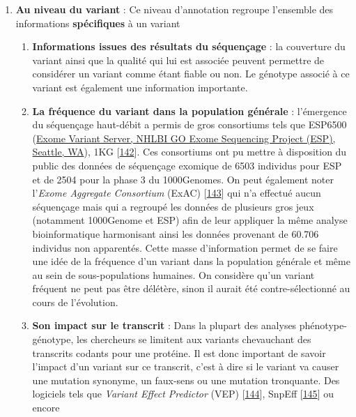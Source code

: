 \documentclass[12pt,twoside]{ugathesis}
\providecommand{\tightlist}{%
  \setlength{\itemsep}{0pt}\setlength{\parskip}{0pt}}
\theoremstyle{definition}
\theoremstyle{definition}
\theoremstyle{remark}
\begin{document}
\begin{enumerate}
\def\labelenumi{\arabic{enumi}.}
\tightlist
\item
  \textbf{Au niveau du variant} : Ce niveau d'annotation regroupe
  l'ensemble des informations \textbf{spécifiques} à un variant

  \begin{enumerate}
  \def\labelenumii{\alph{enumii}.}
  \item
    \textbf{Informations issues des résultats du séquençage} : la
    couverture du variant ainsi que la qualité qui lui est associée
    peuvent permettre de considérer un variant comme étant fiable ou
    non. Le génotype associé à ce variant est également une information
    importante.
  \item
    \textbf{La fréquence du variant dans la population générale} :
    l'émergence du séquençage haut-débit a permis de gros consortiums
    tels que ESP6500 (\href{http://evs.gs.washington.edu/EVS/}{Exome
    Variant Server, NHLBI GO Exome Sequencing Project (ESP), Seattle,
    WA}), 1KG
    {[}\protect\hyperlink{ref-1000GenomesProjectConsortium2015}{142}{]}.
    Ces consortiums ont pu mettre à disposition du public des données de
    séquençage exomique de 6503 individus pour ESP et de 2504 pour la
    phase 3 du 1000Genomes. On peut également noter l'\emph{Exome
    Aggregate Consortium} (ExAC)
    {[}\protect\hyperlink{ref-Lek2016}{143}{]} qui n'a effectué aucun
    séquençage mais qui a regroupé les données de plusieurs gros jeux
    (notamment 1000Genome et ESP) afin de leur appliquer la même analyse
    bioinformatique harmonisant ainsi les données provenant de 60.706
    individus non apparentés. Cette masse d'information permet de se
    faire une idée de la fréquence d'un variant dans la population
    générale et même au sein de sous-populations humaines. On considère
    qu'un variant fréquent ne peut pas être délétère, sinon il aurait
    été contre-sélectionné au cours de l'évolution.
  \item
    \textbf{Son impact sur le transcrit} : Dans la plupart des analyses
    phénotype-génotype, les chercheurs se limitent aux variants
    chevauchant des transcrits codants pour une protéine. Il est donc
    important de savoir l'impact d'un variant sur ce transcrit, c'est à
    dire si le variant va causer une mutation synonyme, un faux-sens ou
    une mutation tronquante. Des logiciels tels que \emph{Variant Effect
    Predictor} (VEP) {[}\protect\hyperlink{ref-McLaren2016}{144}{]},
    SnpEff {[}\protect\hyperlink{ref-Cingolani2012}{145}{]} ou encore

\end{enumerate}
\end{enumerate}
\end{document}
